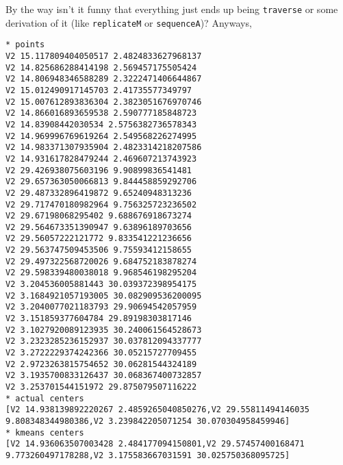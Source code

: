 \documentclass[]{article}
\newenvironment{Shaded}{}{}
\newcommand{\CommentTok}[1]{\textcolor[rgb]{0.38,0.63,0.69}{\textit{#1}}}
\newcommand{\DataTypeTok}[1]{\textcolor[rgb]{0.56,0.13,0.00}{#1}}
\newcommand{\DecValTok}[1]{\textcolor[rgb]{0.25,0.63,0.44}{#1}}
\newcommand{\FunctionTok}[1]{\textcolor[rgb]{0.02,0.16,0.49}{#1}}
\newcommand{\KeywordTok}[1]{\textcolor[rgb]{0.00,0.44,0.13}{\textbf{#1}}}
\newcommand{\NormalTok}[1]{#1}
\newcommand{\OperatorTok}[1]{\textcolor[rgb]{0.40,0.40,0.40}{#1}}
\newcommand{\OtherTok}[1]{\textcolor[rgb]{0.00,0.44,0.13}{#1}}
\newcommand{\StringTok}[1]{\textcolor[rgb]{0.25,0.44,0.63}{#1}}
\begin{document}
By the way isn't it funny that everything just ends up being \texttt{traverse}
or some derivation of it (like \texttt{replicateM} or \texttt{sequenceA})?
Anyways,

\begin{Shaded}
\end{Shaded}

\begin{verbatim}
* points
V2 15.117809404050517 2.4824833627968137
V2 14.825686288414198 2.569457175505424
V2 14.806948346588289 2.3222471406644867
V2 15.012490917145703 2.41735577349797
V2 15.007612893836304 2.3823051676970746
V2 14.866016893659538 2.590777185848723
V2 14.83908442030534 2.5756382736578343
V2 14.969996769619264 2.549568226274995
V2 14.983371307935904 2.4823314218207586
V2 14.931617828479244 2.469607213743923
V2 29.426938075603196 9.90899836541481
V2 29.657363050066813 9.844458859292706
V2 29.487332896419872 9.65240948313236
V2 29.717470180982964 9.756325723236502
V2 29.67198068295402 9.688676918673274
V2 29.564673351390947 9.63896189703656
V2 29.56057222121772 9.833541221236656
V2 29.563747509453506 9.75593412158655
V2 29.497322568720026 9.684752183878274
V2 29.598339480038018 9.968546198295204
V2 3.204536005881443 30.039372398954175
V2 3.1684921057193005 30.082909536200095
V2 3.2040077021183793 29.90694542057959
V2 3.151859377604784 29.89198303817146
V2 3.1027920089123935 30.240061564528673
V2 3.2323285236152937 30.037812094337777
V2 3.2722229374242366 30.05215727709455
V2 2.9723263815754652 30.06281544324189
V2 3.1935700833126437 30.068367400732857
V2 3.253701544151972 29.875079507116222
* actual centers
[V2 14.938139892220267 2.4859265040850276,V2 29.55811494146035 9.808348344980386,V2 3.239842205071254 30.070304958459946]
* kmeans centers
[V2 14.936063507003428 2.484177094150801,V2 29.57457400168471 9.773260497178288,V2 3.175583667031591 30.025750368095725]
\end{verbatim}
\end{document}
